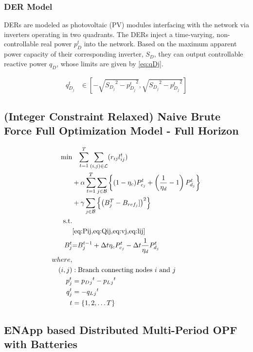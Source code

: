\documentclass{article}
\begin{document}
\subsubsection{DER Model}

DERs are modeled as photovoltaic (PV) modules interfacing with the network via inverters operating in two quadrants. The DERs inject a time-varying, non-controllable real power $p^{t}_{D}$ into the network. Based on the maximum apparent power capacity of their corresponding inverter, $S_{D}$, they can output controllable reactive power $q_{D}$, whose limits are given by \cref{eq:qDj}.

\begin{align}
    { q^{t}_{D_{j}} } 
    &\in
    { \left[-\sqrt{ {S_{D_{j}}}^2 - {p^{t}_{D_{j}}}^2}, \sqrt{ {S_{D_{j}}}^2 - {p^{t}_{D_{j}}}^2}\right] } \label{eq:qDj}
\end{align}

\subsection*{(Integer Constraint Relaxed) Naive Brute Force Full Optimization Model - Full Horizon}

\begin{align}
    \min_{
    } 
    \vspace{-15ex} %
    & \quad
    {\sum_{t = 1}^{T} \sum_{(i, j) \in \mathcal{L}} (r_{ij}l_{ij}^t)}  \nonumber\\
    {} &+ {\alpha \sum_{t = 1}^{T} \sum_{j \in \mathcal{B}} \left\{ (1- \eta_c)P_{c_j}^t + \left(\frac{1}{\eta_d}-1\right) P_{d_j}^t \right\}} \nonumber\\
    {} &+ {\gamma \sum_{j \in \mathcal{B}} \left\{ \left(B^{T}_{j} - B_{ref_{j}}]\right)^2\right\}} \\
    \text{s.t.} & {}\nonumber \\
    {} & {\cref{eq:Pij,eq:Qij,eq:vj,eq:lij}} \\
    {\color{darkgreen}{ B_{j}^{t} }} &\color{darkgreen}{=} { \color{darkgreen}{ B_{j}^{t-1} + \Delta t  \eta_c P_{c_j}^t - \Delta t\frac{1}{\eta_d} P_{d_j}^t } } \\
    {where,} & {} \\
    {(i, j)} &: {\text{Branch connecting nodes $i$ and $j$}} \\
    {p_j^t} &= {p_D{_j}^t - p_L{_j}^t} \\
    {q_j^t} &= {-q_L{_j}^t} \\
    {t} &= {\{1, 2, \ldots T\}}
\end{align}

\subsection{ENApp based Distributed Multi-Period OPF with Batteries}
\end{document}
